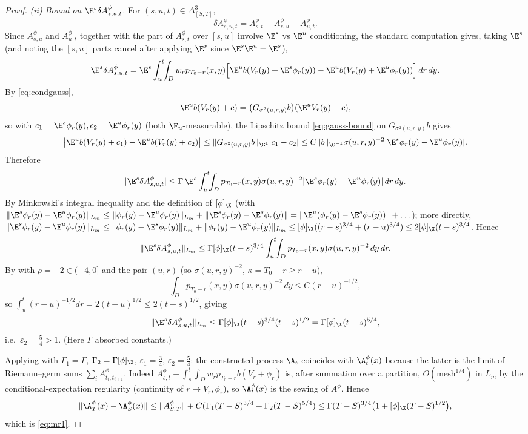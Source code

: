 \begin{proof}
\emph{(ii) Bound on $\E^s\delta A^\phi_{s,u,t}$.} For $(s,u,t)\in\Delta^3_{[S,T]}$,
\[
\delta A^\phi_{s,u,t}=A^\phi_{s,t}-A^\phi_{s,u}-A^\phi_{u,t}.
\]
Since $A^\phi_{s,u}$ and $A^\phi_{u,t}$ together with the part of $A^\phi_{s,t}$ over $[s,u]$ involve $\E^s$ vs $\E^u$ conditioning, the standard computation gives, taking $\E^s$ (and noting the $[s,u]$ parts cancel after applying $\E^s$ since $\E^s\E^u=\E^s$),
\[
\E^s\delta A^\phi_{s,u,t}
=\E^s\int_u^t\!\!\int_D w_r p_{T_0-r}(x,y)\Big[\E^u b(V_r(y)+\E^s\phi_r(y))-\E^u b(V_r(y)+\E^u\phi_r(y))\Big]\,dr\,dy.
\]
By \eqref{eq:condgauss},
\[
\E^u b(V_r(y)+c)=\big(G_{\sigma^2(u,r,y)}b\big)(\E^u V_r(y)+c),
\]
so with $c_1=\E^s\phi_r(y),c_2=\E^u\phi_r(y)$ (both $\F_u$-measurable), the Lipschitz bound \eqref{eq:gauss-bound} on $G_{\sigma^2(u,r,y)}b$ gives
\[
\big|\E^u b(V_r(y)+c_1)-\E^u b(V_r(y)+c_2)\big|\le \|G_{\sigma^2(u,r,y)}b\|_{\C^1}|c_1-c_2|\le C\|b\|_{\C^{-1}}\sigma(u,r,y)^{-2}|\E^s\phi_r(y)-\E^u\phi_r(y)|.
\]
Therefore
\[
|\E^s\delta A^\phi_{s,u,t}|\le \Gamma\,\E^s\int_u^t\!\!\int_D p_{T_0-r}(x,y)\sigma(u,r,y)^{-2}|\E^s\phi_r(y)-\E^u\phi_r(y)|\,dr\,dy.
\]
By Minkowski's integral inequality and the definition of $[\phi]_\X$ (with $\|\E^s\phi_r(y)-\E^u\phi_r(y)\|_{L_m}\le \|\phi_r(y)-\E^u\phi_r(y)\|_{L_m}+\|\E^s\phi_r(y)-\E^s\phi_r(y)\|=\|\E^u(\phi_r(y)-\E^s\phi_r(y))\|+\ldots$); more directly, $\|\E^s\phi_r(y)-\E^u\phi_r(y)\|_{L_m}\le \|\phi_r(y)-\E^s\phi_r(y)\|_{L_m}+\|\phi_r(y)-\E^u\phi_r(y)\|_{L_m}\le [\phi]_\X((r-s)^{3/4}+(r-u)^{3/4})\le 2[\phi]_\X(t-s)^{3/4}$. Hence
\[
\|\E^s\delta A^\phi_{s,u,t}\|_{L_m}\le \Gamma[\phi]_\X(t-s)^{3/4}\int_u^t\!\!\int_D p_{T_0-r}(x,y)\sigma(u,r,y)^{-2}\,dy\,dr.
\]
By  with $\rho=-2\in(-4,0]$ and the pair $(u,r)$ (so $\sigma(u,r,y)^{-2}$, $\kappa=T_0-r\ge r-u$),
\[
\int_D p_{T_0-r}(x,y)\sigma(u,r,y)^{-2}\,dy\le C(r-u)^{-1/2},
\]
so $\int_u^t(r-u)^{-1/2}dr=2(t-u)^{1/2}\le 2(t-s)^{1/2}$, giving
\[
\|\E^s\delta A^\phi_{s,u,t}\|_{L_m}\le \Gamma[\phi]_\X(t-s)^{3/4}(t-s)^{1/2}=\Gamma[\phi]_\X(t-s)^{5/4},
\]
i.e.\ $\varepsilon_2=\tfrac54>1$. (Here $\Gamma$ absorbed constants.)

Applying  with $\Gamma_1=\Gamma$, $\Gamma_2=\Gamma[\phi]_\X$, $\varepsilon_1=\tfrac34$, $\varepsilon_2=\tfrac54$: the constructed process $\A_t$ coincides with $\A^\phi_t(x)$ because the latter is the limit of Riemann–germ sums $\sum_i A^\phi_{t_i,t_{i+1}}$. Indeed $A^\phi_{s,t}-\int_s^t\int_D w_r p_{T_0-r}b(V_r+\phi_r)$ is, after summation over a partition, $O(\text{mesh}^{1/4})$ in $L_m$ by the conditional-expectation regularity (continuity of $r\mapsto V_r,\phi_r$), so $\A^\phi_t(x)$ is the sewing of $A^\phi$. Hence
\[
\|\A^\phi_T(x)-\A^\phi_S(x)\|\le \|A^\phi_{S,T}\|+C(\Gamma_1(T-S)^{3/4}+\Gamma_2(T-S)^{5/4})\le \Gamma(T-S)^{3/4}\big(1+[\phi]_\X(T-S)^{1/2}\big),
\]
which is \eqref{eq:mr1}.


\end{proof}
